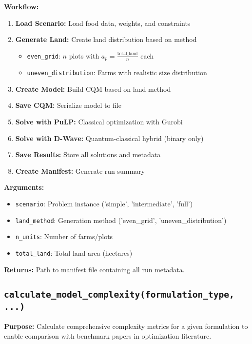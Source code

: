 \documentclass{article}
\begin{document}
\textbf{Workflow:}
\begin{enumerate}
    \item \textbf{Load Scenario:} Load food data, weights, and constraints
    \item \textbf{Generate Land:} Create land distribution based on method
    \begin{itemize}
        \item \texttt{even\_grid}: $n$ plots with $a_p = \frac{\text{total\_land}}{n}$ each
        \item \texttt{uneven\_distribution}: Farms with realistic size distribution
    \end{itemize}
    \item \textbf{Create Model:} Build CQM based on land method
    \item \textbf{Save CQM:} Serialize model to file
    \item \textbf{Solve with PuLP:} Classical optimization with Gurobi
    \item \textbf{Solve with D-Wave:} Quantum-classical hybrid (binary only)
    \item \textbf{Save Results:} Store all solutions and metadata
    \item \textbf{Create Manifest:} Generate run summary
\end{enumerate}

\textbf{Arguments:}
\begin{itemize}
    \item \texttt{scenario}: Problem instance ('simple', 'intermediate', 'full')
    \item \texttt{land\_method}: Generation method ('even\_grid', 'uneven\_distribution')
    \item \texttt{n\_units}: Number of farms/plots
    \item \texttt{total\_land}: Total land area (hectares)
\end{itemize}

\textbf{Returns:} Path to manifest file containing all run metadata.

\subsection{\texttt{calculate\_model\_complexity(formulation\_type, ...)}}

\textbf{Purpose:} Calculate comprehensive complexity metrics for a given formulation to enable comparison with benchmark papers in optimization literature.
\end{document}
